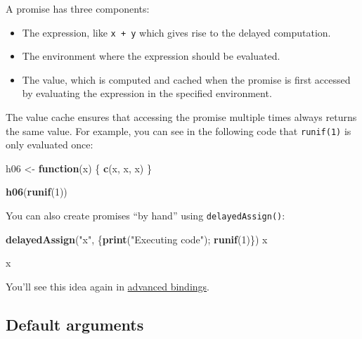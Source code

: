 \documentclass[]{book}
\newenvironment{Shaded}{\begin{snugshade}}{\end{snugshade}}
\newcommand{\KeywordTok}[1]{\textcolor[rgb]{0.13,0.29,0.53}{\textbf{#1}}}
\newcommand{\DecValTok}[1]{\textcolor[rgb]{0.00,0.00,0.81}{#1}}
\newcommand{\StringTok}[1]{\textcolor[rgb]{0.31,0.60,0.02}{#1}}
\newcommand{\ControlFlowTok}[1]{\textcolor[rgb]{0.13,0.29,0.53}{\textbf{#1}}}
\newcommand{\NormalTok}[1]{#1}
\theoremstyle{definition}
\theoremstyle{definition}
\theoremstyle{definition}
\theoremstyle{remark}
\begin{document}
A promise has three components:

\begin{itemize}
\item
  The expression, like \texttt{x\ +\ y} which gives rise to the delayed
  computation.
\item
  The environment where the expression should be evaluated.
\item
  The value, which is computed and cached when the promise is first
  accessed by evaluating the expression in the specified environment.
\end{itemize}

The value cache ensures that accessing the promise multiple times always
returns the same value. For example, you can see in the following code
that \texttt{runif(1)} is only evaluated once:

\begin{Shaded}
\begin{Highlighting}[]
\NormalTok{h06 <-}\StringTok{ }\ControlFlowTok{function}\NormalTok{(x) \{ }
  \KeywordTok{c}\NormalTok{(x, x, x)  }
\NormalTok{\}}

\KeywordTok{h06}\NormalTok{(}\KeywordTok{runif}\NormalTok{(}\DecValTok{1}\NormalTok{))}
\end{Highlighting}
\end{Shaded}

You can also create promises ``by hand'' using \texttt{delayedAssign()}:

\begin{Shaded}
\begin{Highlighting}[]
\KeywordTok{delayedAssign}\NormalTok{(}\StringTok{"x"}\NormalTok{, \{}\KeywordTok{print}\NormalTok{(}\StringTok{"Executing code"}\NormalTok{); }\KeywordTok{runif}\NormalTok{(}\DecValTok{1}\NormalTok{)\})}
\NormalTok{x}
\end{Highlighting}
\end{Shaded}

\begin{Shaded}
\begin{Highlighting}[]
\NormalTok{x}
\end{Highlighting}
\end{Shaded}

You'll see this idea again in
\protect\hyperlink{advanced-bindings}{advanced bindings}.

\subsection{Default arguments}\label{default-arguments}
\end{document}
